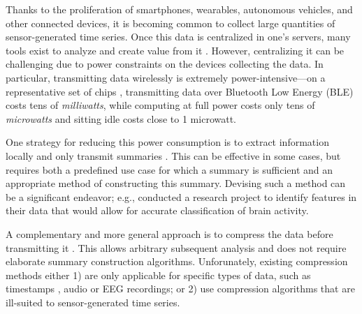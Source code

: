 





Thanks to the proliferation of smartphones, wearables, autonomous vehicles, and other connected devices, it is becoming common to collect large quantities of sensor-generated time series. Once this data is centralized in one's servers, many tools exist to analyze and create value from it \cite{spark, mapreduce, hive, hdfs, influxDB, druid, littleTable, openTSDB}. However, centralizing it can be challenging due to power constraints on the devices collecting the data. In particular, transmitting data wirelessly is extremely power-intensive---on a representative set of chips \cite{cc2540, cc2640}, transmitting data over Bluetooth Low Energy (BLE) costs tens of \textit{milliwatts}, while computing at full power costs only tens of \textit{microwatts} and sitting idle costs close to 1 microwatt.

One strategy for reducing this power consumption is to extract information locally and only transmit summaries \cite{guttagAnanthaEEG, socialFMRI, respawnDB}. This can be effective in some cases, but requires both a predefined use case for which a summary is sufficient and an appropriate method of constructing this summary. Devising such a method can be a significant endeavor; e.g., \cite{guttagAnanthaEEG} conducted a research project to identify features in their data that would allow for accurate classification of brain activity.

A complementary and more general approach is to compress the data before transmitting it \cite{socialFMRI, lachCompress, sensorTransforms, iotSignals, iotCompressCrap}. This allows arbitrary subsequent analysis and does not require elaborate summary construction algorithms. Unforunately, existing compression methods either 1) are only applicable for specific types of data, such as timestamps \cite{gorilla, berkeleyTreeDB, fastpfor}, audio \cite{flac, shorten, aac, vorbis} or EEG \cite{guttagAnanthaEEG, eegCS} recordings; or 2) use compression algorithms that are ill-suited to sensor-generated time series.

